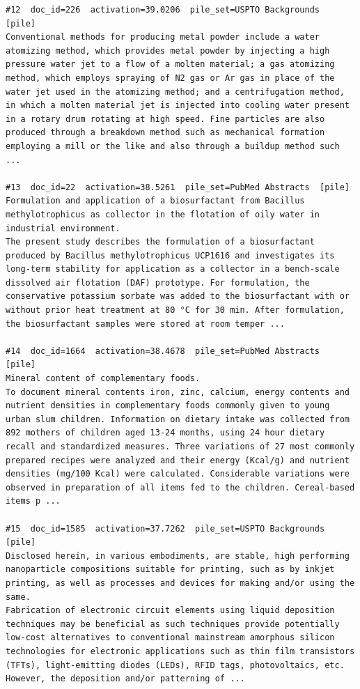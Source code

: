 \begin{verbatim}
#12  doc_id=226  activation=39.0206  pile_set=USPTO Backgrounds  [pile]
Conventional methods for producing metal powder include a water atomizing method, which provides metal powder by injecting a high pressure water jet to a flow of a molten material; a gas atomizing method, which employs spraying of N2 gas or Ar gas in place of the water jet used in the atomizing method; and a centrifugation method, in which a molten material jet is injected into cooling water present in a rotary drum rotating at high speed. Fine particles are also produced through a breakdown method such as mechanical formation employing a mill or the like and also through a buildup method such ...

#13  doc_id=22  activation=38.5261  pile_set=PubMed Abstracts  [pile]
Formulation and application of a biosurfactant from Bacillus methylotrophicus as collector in the flotation of oily water in industrial environment.
The present study describes the formulation of a biosurfactant produced by Bacillus methylotrophicus UCP1616 and investigates its long-term stability for application as a collector in a bench-scale dissolved air flotation (DAF) prototype. For formulation, the conservative potassium sorbate was added to the biosurfactant with or without prior heat treatment at 80 °C for 30 min. After formulation, the biosurfactant samples were stored at room temper ...

#14  doc_id=1664  activation=38.4678  pile_set=PubMed Abstracts  [pile]
Mineral content of complementary foods.
To document mineral contents iron, zinc, calcium, energy contents and nutrient densities in complementary foods commonly given to young urban slum children. Information on dietary intake was collected from 892 mothers of children aged 13-24 months, using 24 hour dietary recall and standardized measures. Three variations of 27 most commonly prepared recipes were analyzed and their energy (Kcal/g) and nutrient densities (mg/100 Kcal) were calculated. Considerable variations were observed in preparation of all items fed to the children. Cereal-based items p ...

#15  doc_id=1585  activation=37.7262  pile_set=USPTO Backgrounds  [pile]
Disclosed herein, in various embodiments, are stable, high performing nanoparticle compositions suitable for printing, such as by inkjet printing, as well as processes and devices for making and/or using the same.
Fabrication of electronic circuit elements using liquid deposition techniques may be beneficial as such techniques provide potentially low-cost alternatives to conventional mainstream amorphous silicon technologies for electronic applications such as thin film transistors (TFTs), light-emitting diodes (LEDs), RFID tags, photovoltaics, etc. However, the deposition and/or patterning of ...


\end{verbatim}
